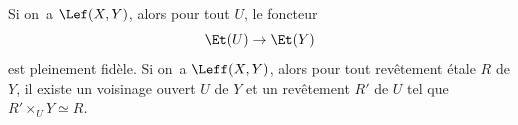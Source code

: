 \begin{corollaire} \label{X.2.5} Si on~a $\Lef (X, Y)$, alors pour tout $U$, le foncteur
\[
\Et(U) \to \Et(Y)
\]
est pleinement fid\`ele. Si on~a $\Leff(X, Y)$, alors pour tout rev\^etement \'etale $R$ de $Y$, il existe un voisinage ouvert $U$ de $Y$ et un rev\^etement $R'$ de $U$ tel que $R' \times_U Y \simeq R$.
\end{corollaire}
